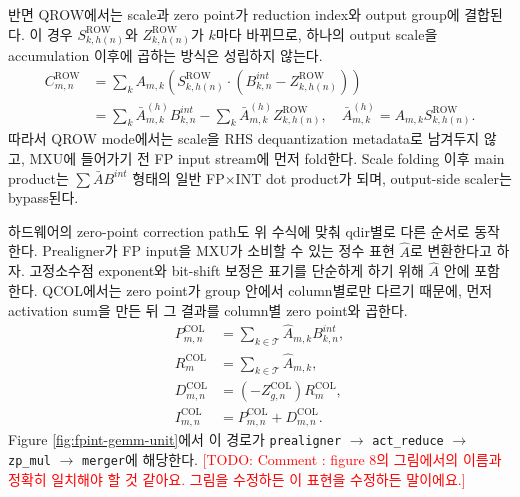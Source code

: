 \documentclass[11pt]{article}
\newcommand{\todo}[1]{\textcolor{red}{[TODO: #1]}}
\newcommand{\fpint}{FP$\times$INT}
\begin{document}
반면 QROW에서는 scale과 zero point가 reduction index와 output group에 결합된다.
이 경우 $S^{\mathrm{ROW}}_{k,h(n)}$와 $Z^{\mathrm{ROW}}_{k,h(n)}$가 $k$마다 바뀌므로, 하나의 output scale을 accumulation 이후에 곱하는 방식은 성립하지 않는다.
\begin{align}
    C^{\mathrm{ROW}}_{m,n}
    &=
    \sum_k A_{m,k}
    \left(
        S^{\mathrm{ROW}}_{k,h(n)} \cdot
        (B^{int}_{k,n} - Z^{\mathrm{ROW}}_{k,h(n)})
    \right) \\
    &=
    \sum_k \bar{A}^{(h)}_{m,k} B^{int}_{k,n}
    -
    \sum_k \bar{A}^{(h)}_{m,k} Z^{\mathrm{ROW}}_{k,h(n)},
    \quad
    \bar{A}^{(h)}_{m,k}=A_{m,k}S^{\mathrm{ROW}}_{k,h(n)} .
    \label{eq:qrow-fpint}
\end{align}
따라서 QROW mode에서는 scale을 RHS dequantization metadata로 남겨두지 않고, MXU에 들어가기 전 FP input stream에 먼저 fold한다.
Scale folding 이후 main product는 $\sum \bar{A}B^{int}$ 형태의 일반 \fpint{} dot product가 되며, output-side scaler는 bypass된다.

하드웨어의 zero-point correction path도 위 수식에 맞춰 qdir별로 다른 순서로 동작한다.
Prealigner가 FP input을 MXU가 소비할 수 있는 정수 표현 $\hat{A}$로 변환한다고 하자.
고정소수점 exponent와 bit-shift 보정은 표기를 단순하게 하기 위해 $\hat{A}$ 안에 포함한다.
QCOL에서는 zero point가 group 안에서 column별로만 다르기 때문에, 먼저 activation sum을 만든 뒤 그 결과를 column별 zero point와 곱한다.
\begin{align}
    P^{\mathrm{COL}}_{m,n} &= \sum_{k \in \mathcal{T}} \hat{A}_{m,k} B^{int}_{k,n}, \\
    R^{\mathrm{COL}}_{m} &= \sum_{k \in \mathcal{T}} \hat{A}_{m,k}, \\
    D^{\mathrm{COL}}_{m,n} &= (-Z^{\mathrm{COL}}_{g,n}) R^{\mathrm{COL}}_{m}, \\
    I^{\mathrm{COL}}_{m,n} &= P^{\mathrm{COL}}_{m,n} + D^{\mathrm{COL}}_{m,n} .
    \label{eq:qcol-correction}
\end{align}
Figure \ref{fig:fpint-gemm-unit}에서 이 경로가 \texttt{prealigner} $\rightarrow$ \texttt{act\_reduce} $\rightarrow$ \texttt{zp\_mul} $\rightarrow$ \texttt{merger}에 해당한다. \todo{Comment : figure 8의 그림에서의 이름과 정확히 일치해야 할 것 같아요. 그림을 수정하든 이 표현을 수정하든 말이에요.}
\end{document}
